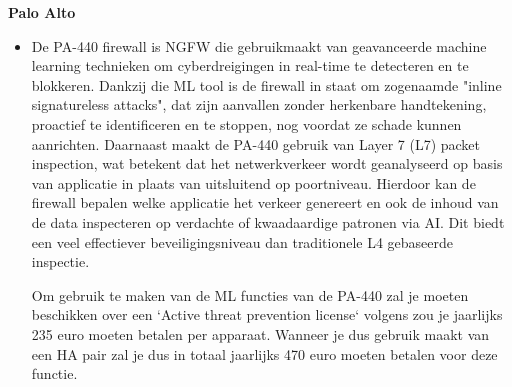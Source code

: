 \textbf{Palo Alto}
\begin{itemize}[label=\textbullet]
    \item De PA-440 firewall is NGFW die gebruikmaakt van geavanceerde machine learning technieken om cyberdreigingen in real-time te detecteren en te blokkeren. Dankzij die ML tool is de firewall in staat om zogenaamde "inline signatureless attacks", dat zijn aanvallen zonder herkenbare handtekening, proactief te identificeren en te stoppen, nog voordat ze schade kunnen aanrichten. Daarnaast maakt de PA-440 gebruik van Layer 7 (L7) packet inspection, wat betekent dat het netwerkverkeer wordt geanalyseerd op basis van applicatie in plaats van uitsluitend op poortniveau. Hierdoor kan de firewall bepalen welke applicatie het verkeer genereert en ook de inhoud van de data inspecteren op verdachte of kwaadaardige patronen via AI. Dit biedt een veel effectiever beveiligingsniveau dan traditionele L4 gebaseerde inspectie. \autocite{PaloAltoDS2025}
    
    Om gebruik te maken van de ML functies van de PA-440 zal je moeten beschikken over een `Active threat prevention license` volgens \textcite{PaloGuardb2025} zou je jaarlijks 235 euro moeten betalen per apparaat. Wanneer je dus gebruik maakt van een HA pair zal je dus in totaal jaarlijks 470 euro moeten betalen voor deze functie.
\end{itemize}

